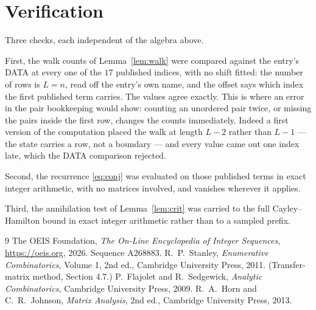 \documentclass[11pt,a4paper]{article}
\theoremstyle{plain}
\theoremstyle{definition}
\begin{document}
\section{Verification}

Three checks, each independent of the algebra above.

First, the walk counts of Lemma~\ref{lem:walk} were compared against the entry's DATA at
every one of the $17$ published indices, with no shift fitted: the number of rows is
$L=n$, read off the entry's own name, and the offset says which index the first
published term carries. The values agree exactly. This is where an error in the pair
bookkeeping would show: counting an unordered pair twice, or missing the pairs inside the
first row, changes the counts immediately. Indeed a first version of the computation
placed the walk at length $L-2$ rather than $L-1$ --- the state carries a row, not a
boundary --- and every value came out one index late, which the DATA comparison rejected.

Second, the recurrence \eqref{eq:conj} was evaluated on those published terms in exact
integer arithmetic, with no matrices involved, and vanishes wherever it applies.

Third, the annihilation test of Lemma~\ref{lem:crit} was carried to the full
Cayley--Hamilton bound in exact integer arithmetic rather than to a sampled prefix.

\begin{thebibliography}{9}
 The OEIS Foundation, \emph{The On-Line Encyclopedia of Integer
Sequences}, \url{https://oeis.org}, 2026. Sequence A268883.
 R.~P.~Stanley, \emph{Enumerative Combinatorics}, Volume 1, 2nd ed.,
Cambridge University Press, 2011. (Transfer-matrix method, Section 4.7.)
 P.~Flajolet and R.~Sedgewick, \emph{Analytic Combinatorics}, Cambridge
University Press, 2009.
 R.~A.~Horn and C.~R.~Johnson, \emph{Matrix Analysis}, 2nd ed., Cambridge
University Press, 2013.
\end{thebibliography}
\end{document}
